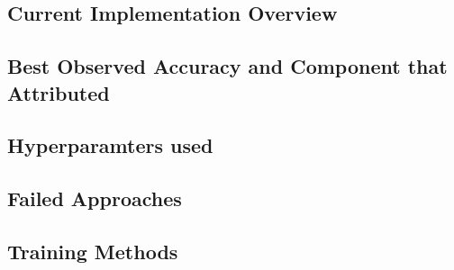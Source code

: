 \subsection{Current Implementation Overview}\label{subsec:current-implementation}


\subsection{Best Observed Accuracy and Component that Attributed}\label{subsec:best-accuracy}

\subsection{Hyperparamters used}\label{subsec:hyperparameters}

\subsection{Failed Approaches}\label{subsec:failed-approaches}

\subsection{Training Methods}\label{subsec:training-methods}